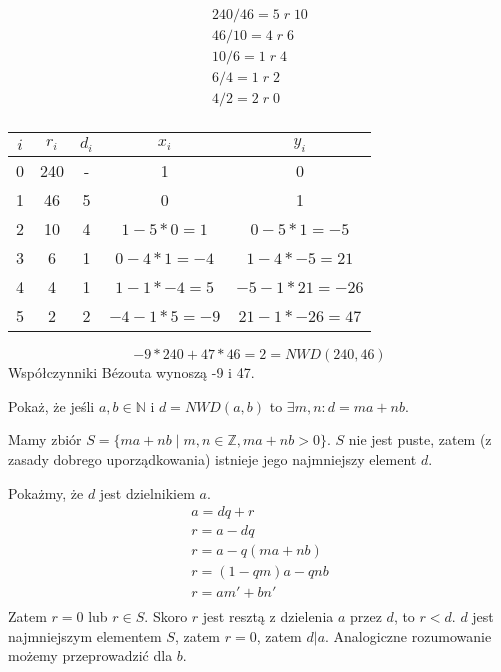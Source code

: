 \documentclass[main.tex]{subfiles}
\begin{document}
    \begin{gather*}
        240 / 46 = 5 \;r\; 10\\
        46 / 10 = 4 \;r\; 6\\
        10 / 6 = 1 \;r\; 4\\
        6 / 4 = 1 \;r\; 2\\
        4 / 2 = 2 \;r\; 0\\
    \end{gather*}

    \begin{table}[H]
        \centering
        \begin{tabular}{|c|c|c|c|c|}
            \hline
            $i$ &  $r_i$& $d_i$ &       $x_i$   &       $y_i$       \\
            \hline
            0 & 240 & - & 1 & 0           \\
            \hline
            1 & 46 & 5 & 0 & 1           \\
            \hline
            2 & 10 & 4 & $1 - 5 * 0 = 1$ & $0 - 5 * 1 = -5$    \\
            \hline
            3 & 6 & 1 & $0 - 4 * 1 = -4$ & $1 - 4 * -5 = 21$   \\
            \hline
            4 & 4 & 1 & $1 - 1 * -4 = 5$ & $-5 - 1 * 21 = -26$ \\
            \hline
            5 & 2 & 2 & $-4 - 1 * 5 = -9$ & $21 - 1 * -26 = 47$ \\
            \hline

        \end{tabular}
    \end{table}

    \[-9 * 240 + 47 * 46 = 2 = NWD(240, 46)\]
    Współczynniki Bézouta wynoszą -9 i 47.\\

    \begin{exercise}
        Pokaż, że jeśli $a, b \in \mathbb{N}$ i $d = NWD(a, b)$ to $\exists m, n : d = ma + nb$.
    \end{exercise}

    Mamy zbiór $S = \{ma + nb \; | \; m, n \in \mathbb{Z}, ma + nb > 0\}$. $S$ nie jest puste, zatem (z zasady dobrego uporządkowania) istnieje jego najmniejszy element $d$.

    Pokażmy, że $d$ jest dzielnikiem $a$.
    \begin{gather*}
        a = dq + r\\
        r = a - dq\\
        r = a - q(ma + nb)\\
        r = (1 - qm)a - qnb\\
        r = am' + bn'\\
    \end{gather*}
    Zatem $r = 0$ lub $r \in S$. Skoro $r$ jest resztą z dzielenia $a$ przez $d$, to $r < d$. $d$ jest najmniejszym elementem $S$, zatem $r = 0$, zatem $d | a$. Analogiczne rozumowanie możemy przeprowadzić dla $b$.
\end{document}
